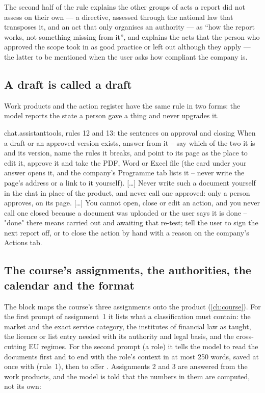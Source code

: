 The second half of the rule explains the other groups of acts a report did not assess on their
own --- a directive, assessed through the national law that transposes it, and an act that
only organises an authority --- as \enquote{how the report works, not something missing from
it}, and explains the acts that the person who approved the scope took in as good practice or
left out although they apply --- the latter to be mentioned when the user asks how compliant the
company is.

\subsection{A draft is called a draft}

Work products and the action register have the same rule in two forms: the model reports the
state a person gave a thing and never upgrades it.

\begin{promptexcerpt}{chat.assistant}{tools, rules 12 and 13: the sentences on approval and closing}
When a draft or an approved version exists, answer from it – say which of the two it is and its version, name the rules it breaks, and point to its page as the place to edit it, approve it and take the PDF, Word or Excel file (the card under your answer opens it, and the company's Programme tab lists it – never write the page's address or a link to it yourself).
[…]
Never write such a document yourself in the chat in place of the product, and never call one approved: only a person approves, on its page.
[…]
You cannot open, close or edit an action, and you never call one closed because a document was uploaded or the user says it is done – "done" there means carried out and awaiting that re-test; tell the user to sign the next report off, or to close the action by hand with a reason on the company's Actions tab.
\end{promptexcerpt}

\subsection{The course's assignments, the authorities, the calendar and the format}

The  block maps the course's three assignments onto the product
(\cref{ch:course}). For the first prompt of assignment~1 it lists what a classification must
contain: the market and the exact service category, the institutes of financial law as taught,
the licence or list entry needed with its authority and legal basis, and the cross-cutting EU
regimes. For the second prompt (a role) it tells the model to read the documents first and to
end with the role's context in at most 250 words, saved at once with  (rule~1),
then to offer . Assignments 2 and 3 are answered from the work products, and the model is
told that the numbers in them are computed, not its own:

